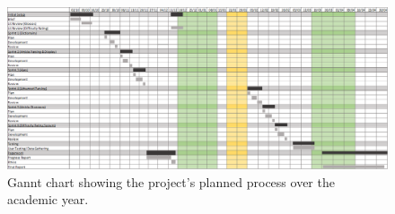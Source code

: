 \begin{figure}[H]
	\caption[Gannt Chart of the Project]{Gannt chart showing the project's planned process over the academic year.}
	\label{fig:gannt}
	\begin{center}
	\includegraphics[width=\textwidth]{Graphics/Gannt}
	\end{center}
\end{figure}